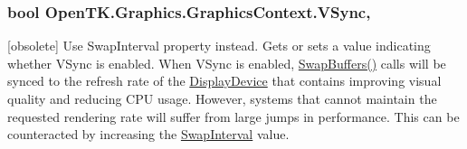 \hypertarget{class_open_t_k_1_1_graphics_1_1_graphics_context_a502b2543a983bba6ceba9762212e290b}{
\subsubsection[{V\-Sync}]{\setlength{\rightskip}{0pt plus 5cm}bool Open\-T\-K.\-Graphics.\-Graphics\-Context.\-V\-Sync\hspace{0.3cm}{\ttfamily [get]}, {\ttfamily [set]}}}\label{class_open_t_k_1_1_graphics_1_1_graphics_context_a502b2543a983bba6ceba9762212e290b}


\mbox{[}obsolete\mbox{]} Use Swap\-Interval property instead. Gets or sets a value indicating whether V\-Sync is enabled. When V\-Sync is enabled, \hyperlink{class_open_t_k_1_1_graphics_1_1_graphics_context_ab73c61bea26369cf76dff2165f5084cf}{Swap\-Buffers()} calls will be synced to the refresh rate of the \hyperlink{class_open_t_k_1_1_display_device}{Display\-Device} that contains improving visual quality and reducing C\-P\-U usage. However, systems that cannot maintain the requested rendering rate will suffer from large jumps in performance. This can be counteracted by increasing the \hyperlink{class_open_t_k_1_1_graphics_1_1_graphics_context_a860ca9db2d767d969b0b5a6c9b7b0f46}{Swap\-Interval} value. 

